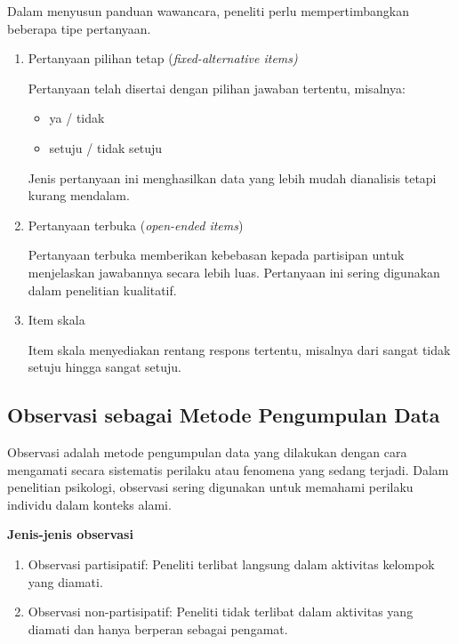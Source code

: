\documentclass[
  indonesian,
  letterpaper,
  DIV=11,
  numbers=noendperiod]{scrreprt}
\providecommand{\tightlist}{%
  \setlength{\itemsep}{0pt}\setlength{\parskip}{0pt}}
\begin{document}
Dalam menyusun panduan wawancara, peneliti perlu mempertimbangkan
beberapa tipe pertanyaan.

\begin{enumerate}
\def\labelenumi{\alph{enumi}.}
\item
  Pertanyaan pilihan tetap (\emph{fixed-alternative items)}

  Pertanyaan telah disertai dengan pilihan jawaban tertentu, misalnya:

  \begin{itemize}
  \tightlist
  \item
    ya / tidak
  \item
    setuju / tidak setuju
  \end{itemize}

  Jenis pertanyaan ini menghasilkan data yang lebih mudah dianalisis
  tetapi kurang mendalam.
\item
  Pertanyaan terbuka (\emph{open-ended items})

  Pertanyaan terbuka memberikan kebebasan kepada partisipan untuk
  menjelaskan jawabannya secara lebih luas. Pertanyaan ini sering
  digunakan dalam penelitian kualitatif.
\item
  Item skala

  Item skala menyediakan rentang respons tertentu, misalnya dari sangat
  tidak setuju hingga sangat setuju.
\end{enumerate}

\subsection{Observasi sebagai Metode Pengumpulan
Data}\label{observasi-sebagai-metode-pengumpulan-data}

Observasi adalah metode pengumpulan data yang dilakukan dengan cara
mengamati secara sistematis perilaku atau fenomena yang sedang terjadi.
Dalam penelitian psikologi, observasi sering digunakan untuk memahami
perilaku individu dalam konteks alami.

\textbf{Jenis-jenis observasi}

\begin{enumerate}
\def\labelenumi{\alph{enumi}.}
\tightlist
\item
  Observasi partisipatif: Peneliti terlibat langsung dalam aktivitas
  kelompok yang diamati.
\item
  Observasi non-partisipatif: Peneliti tidak terlibat dalam aktivitas
  yang diamati dan hanya berperan sebagai pengamat.
\end{enumerate}
\end{document}
